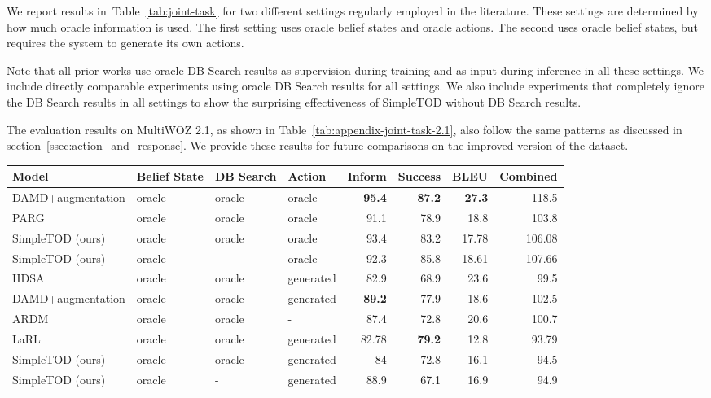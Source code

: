 \documentclass{article}
\begin{document}
We report results in~Table~\ref{tab:joint-task} for two different settings regularly employed in the literature.
These settings are determined by how much oracle information is used.
The first setting uses oracle belief states and oracle actions.
The second uses oracle belief states, but requires the system to generate its own actions.


Note that all prior works use oracle DB Search results as supervision during training and as input during inference in all these settings.
We include directly comparable experiments using oracle DB Search results for all settings.
We also include experiments that completely ignore the DB Search results in all settings to show the surprising effectiveness of SimpleTOD without DB Search results.






 The evaluation results on MultiWOZ 2.1, as shown in Table~\ref{tab:appendix-joint-task-2.1}, also follow the same patterns as discussed in section~\ref{ssec:action_and_response}.
 We provide these results for future comparisons on the improved version of the dataset.

\begin{table*}[htb!]
\centering
\small
\begin{tabular}{llllrrrr}
\hline
Model & Belief State & DB Search & Action & Inform &Success & BLEU & Combined\\
\hline
DAMD+augmentation & oracle & oracle & oracle & \textbf{95.4} & \textbf{87.2} & \textbf{27.3} & 118.5 \\
PARG & oracle & oracle & oracle & 91.1 & 78.9 & 18.8 & 103.8 \\
SimpleTOD (ours) & oracle & oracle & oracle & 93.4 & 83.2 & 17.78 & 106.08 \\
SimpleTOD (ours) & oracle & - & oracle & 92.3 & 85.8 & 18.61 & 107.66 \\
\hline
HDSA & oracle & oracle & generated & 82.9 & 68.9 & 23.6 & 99.5 \\
DAMD+augmentation & oracle & oracle & generated & \textbf{89.2} & 77.9 & 18.6 & 102.5 \\
ARDM & oracle & oracle & - & 87.4 & 72.8 & 20.6 & 100.7 \\
LaRL & oracle & oracle & generated & 82.78 & \textbf{79.2} & 12.8 & 93.79 \\
SimpleTOD (ours) & oracle & oracle & generated & 84 & 72.8 & 16.1 & 94.5 \\
SimpleTOD (ours) & oracle & - & generated & 88.9 & 67.1 & 16.9 & 94.9 \\
\hline
\end{tabular}
\caption{\label{tab:joint-task}
SimpleTOD results on MultiWOZ 2.0 using oracle information.
}
\end{table*}
\end{document}
